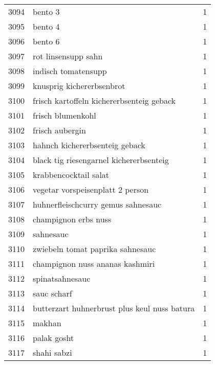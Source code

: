 \begin{tabular}{llr}
3094 &                                            bento 3 &      1 \\
3095 &                                            bento 4 &      1 \\
3096 &                                            bento 6 &      1 \\
3097 &                                rot linsensupp sahn &      1 \\
3098 &                                indisch tomatensupp &      1 \\
3099 &                          knusprig kichererbsenbrot &      1 \\
3100 &          frisch kartoffeln kichererbsenteig geback &      1 \\
3101 &                                  frisch blumenkohl &      1 \\
3102 &                                    frisch aubergin &      1 \\
3103 &                     hahnch kichererbsenteig geback &      1 \\
3104 &            black tig riesengarnel kichererbsenteig &      1 \\
3105 &                              krabbencocktail salat &      1 \\
3106 &                   vegetar vorspeisenplatt 2 person &      1 \\
3107 &                 huhnerfleischcurry gemus sahnesauc &      1 \\
3108 &                               champignon erbs nuss &      1 \\
3109 &                                          sahnesauc &      1 \\
3110 &                   zwiebeln tomat paprika sahnesauc &      1 \\
3111 &                    champignon nuss ananas kashmiri &      1 \\
3112 &                                    spinatsahnesauc &      1 \\
3113 &                                        sauc scharf &      1 \\
3114 &       butterzart huhnerbrust plus keul nuss batura &      1 \\
3115 &                                             makhan &      1 \\
3116 &                                        palak gosht &      1 \\
3117 &                                        shahi sabzi &      1 \\

\end{tabular}
